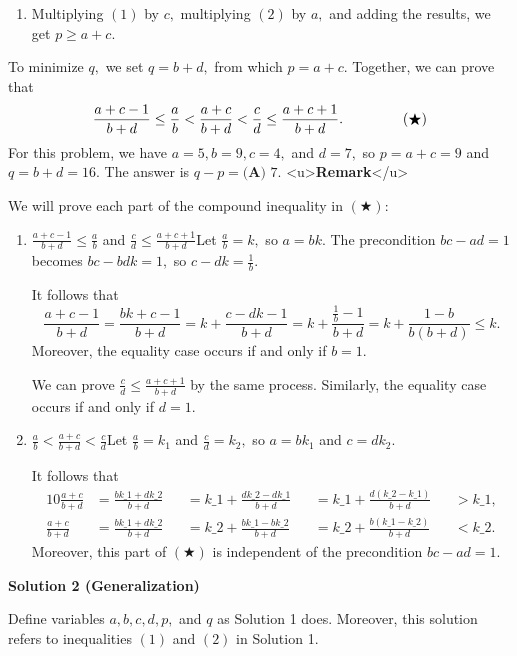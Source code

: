 \begin{enumerate}
\begin{enumerate}
        \item Multiplying $(1)$ by $c,$ multiplying $(2)$ by $a,$ and adding the results, we get $p\geq a+c.$

            \end{enumerate}
            To minimize $q,$ we set $q=b+d,$ from which $p=a+c.$ Together, we can prove that 
 \[\frac{a+c-1}{b+d}\leq\frac ab<\frac{a+c}{b+d}<\frac cd\leq\frac{a+c+1}{b+d}. \hspace{15mm} (\bigstar)\]For this problem, we have $a=5,b=9,c=4,$ and $d=7,$ so $p=a+c=9$ and $q=b+d=16.$ The answer is $q-p=\boxed{\textbf{(A) } 7}.$
<u>\textbf{Remark}</u>

 We will prove each part of the compound inequality in $(\bigstar):$

            \begin{enumerate} 
        \item $\frac{a+c-1}{b+d}\leq\frac ab$ and $\frac cd\leq\frac{a+c+1}{b+d}$Let $\frac ab=k,$ so $a=bk.$ The precondition $bc-ad=1$ becomes $bc-bdk=1,$ so $c-dk=\frac1b.$ 

 It follows that 
 \[\frac{a+c-1}{b+d}=\frac{bk+c-1}{b+d}=k+\frac{c-dk-1}{b+d}=k+\frac{\frac1b-1}{b+d}=k+\frac{1-b}{b(b+d)}\leq k.\] Moreover, the equality case occurs if and only if $b=1.$ 

 We can prove $\frac cd\leq\frac{a+c+1}{b+d}$ by the same process. Similarly, the equality case occurs if and only if $d=1.$

        \item $\frac ab<\frac{a+c}{b+d}<\frac cd$Let $\frac ab=k_1$ and $\frac cd=k_2,$ so $a=bk_1$ and $c=dk_2.$ 

 It follows that
 \begin{alignat*}{10} \frac{a+c}{b+d}&=\frac{bk\_1+dk\_2}{b+d}&&=k\_1+\frac{dk\_2-dk\_1}{b+d}&&=k\_1+\frac{d(k\_2-k\_1)}{b+d}&&>k\_1, \\ \frac{a+c}{b+d}&=\frac{bk\_1+dk\_2}{b+d}&&=k\_2+\frac{bk\_1-bk\_2}{b+d}&&=k\_2+\frac{b(k\_1-k\_2)}{b+d}&&<k\_2. \end{alignat*}Moreover, this part of $(\bigstar)$ is independent of the precondition $bc-ad=1.$

            \end{enumerate}
            



\textbf{Solution 2 (Generalization)}

Define variables $a,b,c,d,p,$ and $q$ as Solution 1 does. Moreover, this solution refers to inequalities $(1)$ and $(2)$ in Solution 1.


\end{enumerate}

